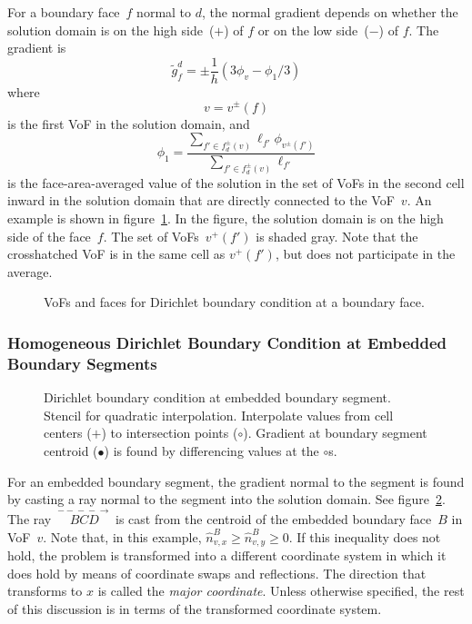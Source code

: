 For a boundary face~$f$ normal to $d$, the normal gradient depends on
whether the solution domain is on the high side~($+$) of $f$ or on the
low side~($-$) of $f$.  The gradient is
\begin{equation}
\widetilde{g}^d_f = \pm \frac{1}{h} \left ( 3 \phi_v - \phi_1/3 \right)
\end{equation}
where
\begin{equation}
v = v^\pm(f)
\end{equation}
is the first VoF in the solution domain,
and
\begin{equation}
\phi_1 = \frac{\displaystyle
\sum_{f'\in f^\pm_d(v)} \ell_{f'} \phi_{v^\pm(f')}
}{\displaystyle
\sum_{f'\in f^\pm_d(v)} \ell_{f'}
}
\end{equation}
is the face-area-averaged value of the solution in the set of VoFs in
the second cell inward in the solution domain that are directly
connected to the VoF~$v$.  An example is shown in
figure~\ref{fig::dirbc}.  In the figure, the solution domain is on the
high side of the face~$f$.  The set of VoFs~$v^+(f')$ is shaded gray.
Note that the crosshatched VoF is in the same cell as $v^+(f')$, but
does not participate in the average.

\begin{figure}
\epsfxsize=3.0in
\hspace{1.0in} 
\caption{VoFs and faces for Dirichlet boundary condition at a boundary
face.}
\label{fig::dirbc}
\end{figure}

\subsubsection{Homogeneous Dirichlet Boundary Condition at Embedded
Boundary Segments}
\label{sec::ebbc}

\begin{figure}
\epsfxsize=3.0in
\hspace{1.0in} 
\caption{Dirichlet boundary condition at embedded boundary segment.
Stencil for quadratic interpolation.  Interpolate values from cell
centers ($+$) to intersection points ($\circ$).  Gradient at boundary
segment centroid ($\bullet$) is found by differencing values at the
$\circ$s.}
\label{fig::ebdirbc2D}
\end{figure}

For an embedded boundary segment, the gradient normal to the segment
is found by casting a ray normal to the segment into the solution
domain.  See figure~\ref{fig::ebdirbc2D}.  The
ray~$\stackrel{-\!\!-\!\!-\!\!-\!\!\!\longrightarrow}{B\!C\!D}$ is cast
from the centroid of the embedded boundary face~$B$ in VoF~$v$.  Note
that, in this example, $\widehat{n}^B_{v,x} \ge \widehat{n}^B_{v,y}
\ge 0$.  If this inequality does not hold, the problem is transformed
into a different coordinate system in which it does hold by means of
coordinate swaps and reflections.  The direction that transforms
to $x$ is called the {\em major coordinate}.  Unless otherwise
specified, the rest of this discussion is in terms of the transformed
coordinate system.  

